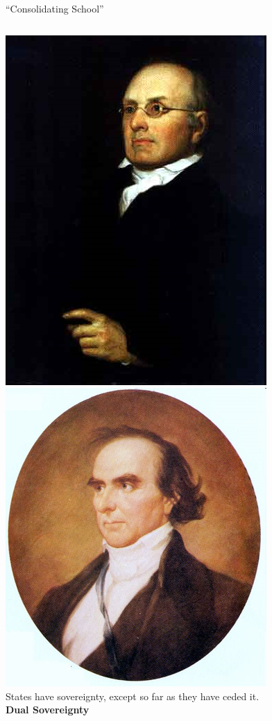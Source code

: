 \begin{frame}{``Consolidating School''}
    \begin{columns}[c]
            \centering
            \includegraphics[height=0.4\textheight]{img/story-portrait.png} \\
            \includegraphics[height=0.4\textheight]{img/daniel-webster-portrait.png} \\
        \column{0.5\textheight}
            States have sovereignty, except so far as they have ceded it. \\
            \pause
            \vspace{30pt} \textbf{Dual Sovereignty}
    \end{columns}
\end{frame}

